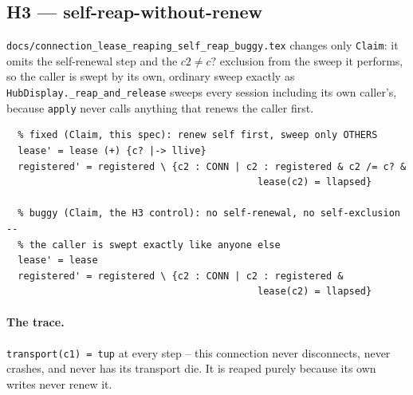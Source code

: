 \documentclass[a4paper,10pt,fleqn]{article}
\begin{document}
\subsection{H3 --- self-reap-without-renew}
\label{sec:fidelity-h3}

\texttt{docs/connection\_lease\_reaping\_self\_reap\_buggy.tex} changes
only \texttt{Claim}: it omits the self-renewal step and the
\(c2 \neq c?\) exclusion from the sweep it performs, so the caller is
swept by its own, ordinary sweep exactly as
\texttt{HubDisplay.\_reap\_and\_release} sweeps every session including
its own caller's, because \texttt{apply} never calls anything that
renews the caller first.

\begin{verbatim}
  % fixed (Claim, this spec): renew self first, sweep only OTHERS
  lease' = lease (+) {c? |-> llive}
  registered' = registered \ {c2 : CONN | c2 : registered & c2 /= c? &
                                            lease(c2) = llapsed}

  % buggy (Claim, the H3 control): no self-renewal, no self-exclusion --
  % the caller is swept exactly like anyone else
  lease' = lease
  registered' = registered \ {c2 : CONN | c2 : registered &
                                            lease(c2) = llapsed}
\end{verbatim}

\paragraph{The trace.} \texttt{transport(c1) = tup} at every step -- this
connection never disconnects, never crashes, and never has its transport
die. It is reaped purely because its own writes never renew it.
\end{document}

